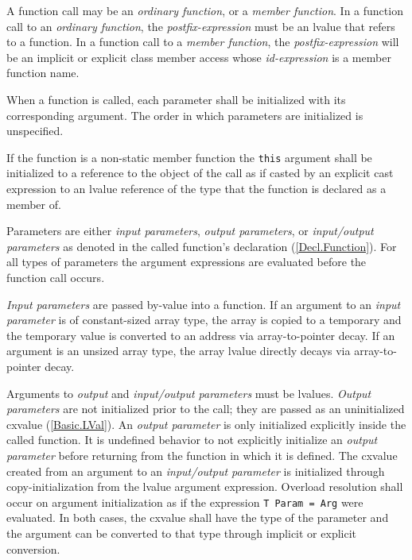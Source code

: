 
\p A function call may be an \textit{ordinary function}, or a \textit{member
function}. In a function call to an \textit{ordinary function}, the
\textit{postfix-expression} must be an lvalue that refers to a function. In a
function call to a \textit{member function}, the \textit{postfix-expression}
will be an implicit or explicit class member access whose \textit{id-expression}
is a member function name.

\p When a function is called, each parameter shall be initialized with its
corresponding argument. The order in which parameters are initialized is
unspecified.

\p If the function is a non-static member function the \texttt{this} argument
shall be initialized to a reference to the object of the call as if casted by an
explicit cast expression to an lvalue reference of the type that the function is
declared as a member of.

\p Parameters are either \textit{input parameters}, \textit{output parameters},
or \textit{input/output parameters} as denoted in the called function's
declaration (\ref{Decl.Function}). For all types of parameters the argument
expressions are evaluated before the function call occurs.

\p \textit{Input parameters} are passed by-value into a function. If an argument
to an \textit{input parameter} is of constant-sized array type, the array is
copied to a temporary and the temporary value is converted to an address via
array-to-pointer decay. If an argument is an unsized array type, the array
lvalue directly decays via array-to-pointer decay.


\p Arguments to \textit{output} and \textit{input/output parameters} must be
lvalues. \textit{Output parameters} are not initialized prior to the call; they
are passed as an uninitialized cxvalue (\ref{Basic.LVal}). An \textit{output
parameter} is only initialized explicitly inside the called function. It is
undefined behavior to not explicitly initialize an \textit{output parameter}
before returning from the function in which it is defined. The cxvalue created
from an argument to an \textit{input/output parameter} is initialized through
copy-initialization from the lvalue argument expression. Overload resolution
shall occur on argument initialization as if the expression \texttt{T Param =
Arg} were evaluated. In both cases, the cxvalue shall have the type of the
parameter and the argument can be converted to that type through implicit or
explicit conversion.

